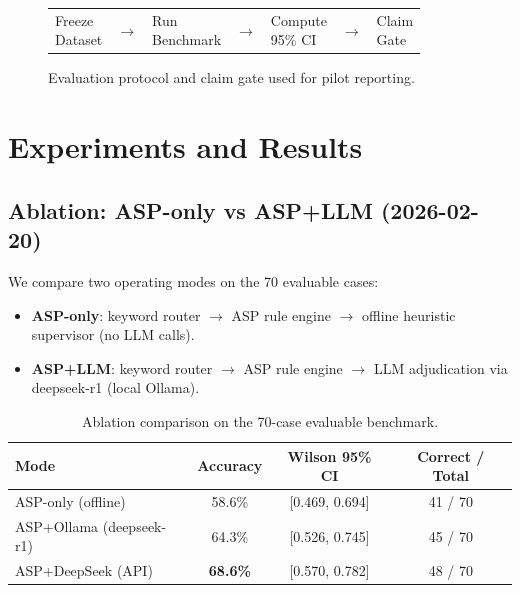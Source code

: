 \documentclass[11pt]{article}
\begin{document}
\begin{figure}[h]
\centering
\setlength{\tabcolsep}{6pt}
\renewcommand{\arraystretch}{1.2}
\begin{tabular}{m{2.4cm}c m{2.4cm}c m{2.4cm}c m{2.4cm}}
\fbox{\parbox[c][1.4cm][c]{2.2cm}{\centering Freeze\\Dataset}} &
$\rightarrow$ &
\fbox{\parbox[c][1.4cm][c]{2.2cm}{\centering Run\\Benchmark}} &
$\rightarrow$ &
\fbox{\parbox[c][1.4cm][c]{2.2cm}{\centering Compute\\95\% CI}} &
$\rightarrow$ &
\fbox{\parbox[c][1.4cm][c]{2.2cm}{\centering Claim\\Gate}}
\end{tabular}
\caption{Evaluation protocol and claim gate used for pilot reporting.}
\label{fig:gate}
\end{figure}

\section{Experiments and Results}
\subsection{Ablation: ASP-only vs ASP+LLM (2026-02-20)}
We compare two operating modes on the 70 evaluable cases:
\begin{itemize}[nosep]
  \item \textbf{ASP-only}: keyword router $\rightarrow$ ASP rule engine $\rightarrow$ offline heuristic supervisor (no LLM calls).
  \item \textbf{ASP+LLM}: keyword router $\rightarrow$ ASP rule engine $\rightarrow$ LLM adjudication via deepseek-r1 (local Ollama).
\end{itemize}

\begin{table}[h]
\centering
\begin{tabular}{lccc}
\toprule
Mode & Accuracy & Wilson 95\% CI & Correct / Total \\
\midrule
ASP-only (offline) & 58.6\% & [0.469, 0.694] & 41 / 70 \\
ASP+Ollama (deepseek-r1) & 64.3\% & [0.526, 0.745] & 45 / 70 \\
ASP+DeepSeek (API) & \textbf{68.6\%} & [0.570, 0.782] & 48 / 70 \\
\bottomrule
\end{tabular}
\caption{Ablation comparison on the 70-case evaluable benchmark.}
\label{tab:ablation}
\end{table}
\end{document}
